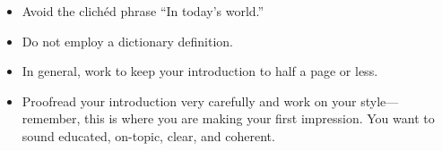 \begin{itemize}
\item Avoid the clich\'ed phrase ``In today's world.''
        	
\item Do not employ a dictionary definition.
       	
\item In general, work to keep your introduction to half a page or less.    	  
 
\item Proofread your introduction very carefully and work on your style---remember, this is where you are making your first impression. You want to sound educated, on-topic, clear, and coherent.
 \end{itemize}
 
